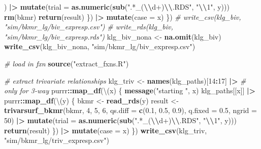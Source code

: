 \documentclass[12pt, twoside]{amherstthesis}
\newenvironment{Shaded}{\begin{snugshade}}{\end{snugshade}}
\newcommand{\AttributeTok}[1]{\textcolor[rgb]{0.13,0.29,0.53}{#1}}
\newcommand{\CommentTok}[1]{\textcolor[rgb]{0.56,0.35,0.01}{\textit{#1}}}
\newcommand{\DecValTok}[1]{\textcolor[rgb]{0.00,0.00,0.81}{#1}}
\newcommand{\FloatTok}[1]{\textcolor[rgb]{0.00,0.00,0.81}{#1}}
\newcommand{\FunctionTok}[1]{\textcolor[rgb]{0.13,0.29,0.53}{\textbf{#1}}}
\newcommand{\NormalTok}[1]{#1}
\newcommand{\OtherTok}[1]{\textcolor[rgb]{0.56,0.35,0.01}{#1}}
\newcommand{\SpecialCharTok}[1]{\textcolor[rgb]{0.81,0.36,0.00}{\textbf{#1}}}
\newcommand{\StringTok}[1]{\textcolor[rgb]{0.31,0.60,0.02}{#1}}
\begin{document}
\begin{Shaded}
\begin{Highlighting}[]
\NormalTok{        ) }\SpecialCharTok{|\textgreater{}} 
          \FunctionTok{mutate}\NormalTok{(}\AttributeTok{trial =} \FunctionTok{as.numeric}\NormalTok{(}\FunctionTok{sub}\NormalTok{(}\StringTok{".*\_(}\SpecialCharTok{\textbackslash{}\textbackslash{}}\StringTok{d+)}\SpecialCharTok{\textbackslash{}\textbackslash{}}\StringTok{.RDS"}\NormalTok{, }\StringTok{"}\SpecialCharTok{\textbackslash{}\textbackslash{}}\StringTok{1"}\NormalTok{, y)))}
        \FunctionTok{rm}\NormalTok{(bkmr)}
        \FunctionTok{return}\NormalTok{(result)}
\NormalTok{      \}) }\SpecialCharTok{|\textgreater{}} 
      \FunctionTok{mutate}\NormalTok{(}\AttributeTok{case =}\NormalTok{ x)}
\NormalTok{  \})}
\CommentTok{\# write\_csv(klg\_biv, "sim/bkmr\_lg/biv\_expresp.csv")}
\CommentTok{\# write\_rds(klg\_biv, "sim/bkmr\_lg/biv\_expresp.rds")}
\NormalTok{klg\_biv\_nona }\OtherTok{\textless{}{-}} \FunctionTok{na.omit}\NormalTok{(klg\_biv)}
\FunctionTok{write\_csv}\NormalTok{(klg\_biv\_nona, }\StringTok{"sim/bkmr\_lg/biv\_expresp.csv"}\NormalTok{)}

\CommentTok{\# load in fxn}
\FunctionTok{source}\NormalTok{(}\StringTok{"extract\_fxns.R"}\NormalTok{)}

\CommentTok{\# extract trivariate relationships}
\NormalTok{klg\_triv }\OtherTok{\textless{}{-}} \FunctionTok{names}\NormalTok{(klg\_paths)[}\DecValTok{14}\SpecialCharTok{:}\DecValTok{17}\NormalTok{] }\SpecialCharTok{|\textgreater{}} \CommentTok{\# only for 3{-}way}
\NormalTok{  purrr}\SpecialCharTok{::}\FunctionTok{map\_df}\NormalTok{(\textbackslash{}(x) \{}
    \FunctionTok{message}\NormalTok{(}\StringTok{"starting "}\NormalTok{, x)}
\NormalTok{    klg\_paths[[x]] }\SpecialCharTok{|\textgreater{}} 
\NormalTok{      purrr}\SpecialCharTok{::}\FunctionTok{map\_df}\NormalTok{(\textbackslash{}(y) \{}
\NormalTok{        bkmr }\OtherTok{\textless{}{-}} \FunctionTok{read\_rds}\NormalTok{(y)}
\NormalTok{        result }\OtherTok{\textless{}{-}} \FunctionTok{trivarsurf\_bkmr}\NormalTok{(bkmr, }\DecValTok{4}\NormalTok{, }\DecValTok{5}\NormalTok{, }\DecValTok{6}\NormalTok{, }
                                  \AttributeTok{qs.diff =} \FunctionTok{c}\NormalTok{(}\FloatTok{0.1}\NormalTok{, }\FloatTok{0.5}\NormalTok{, }\FloatTok{0.9}\NormalTok{), }
                                  \AttributeTok{q.fixed =} \FloatTok{0.5}\NormalTok{, }\AttributeTok{ngrid =} \DecValTok{50}\NormalTok{) }\SpecialCharTok{|\textgreater{}} 
          \FunctionTok{mutate}\NormalTok{(}\AttributeTok{trial =} \FunctionTok{as.numeric}\NormalTok{(}\FunctionTok{sub}\NormalTok{(}\StringTok{".*\_(}\SpecialCharTok{\textbackslash{}\textbackslash{}}\StringTok{d+)}\SpecialCharTok{\textbackslash{}\textbackslash{}}\StringTok{.RDS"}\NormalTok{, }\StringTok{"}\SpecialCharTok{\textbackslash{}\textbackslash{}}\StringTok{1"}\NormalTok{, y)))}
        \FunctionTok{return}\NormalTok{(result)}
\NormalTok{      \}) }\SpecialCharTok{|\textgreater{}} 
      \FunctionTok{mutate}\NormalTok{(}\AttributeTok{case =}\NormalTok{ x)}
\NormalTok{  \})}
\FunctionTok{write\_csv}\NormalTok{(klg\_triv, }\StringTok{"sim/bkmr\_lg/triv\_expresp.csv"}\NormalTok{)}


\end{Highlighting}
\end{Shaded}
\end{document}
